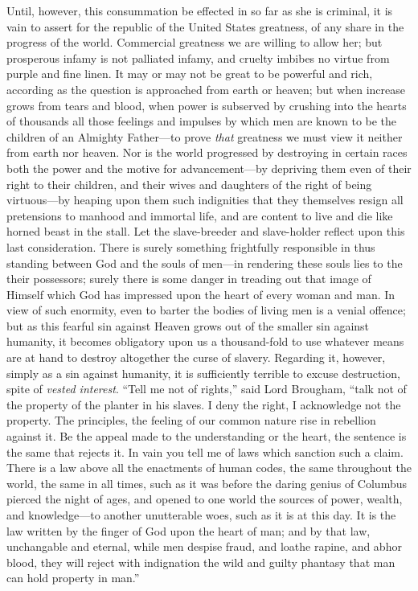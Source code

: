 Until, however, this consummation be effected in so far as she is criminal, it
is vain to assert for the republic of the United States greatness, of any share
in the progress of the world. Commercial greatness we are willing to allow her;
but prosperous infamy is not palliated infamy, and cruelty imbibes no virtue
from purple and fine linen. It may or may not be great to be powerful and rich,
according as the question is approached from earth or heaven; but when increase
grows from tears and blood, when power is subserved by crushing into the hearts
of thousands all those feelings and impulses by which men are known to be the
children of an Almighty Father---to prove \emph{that} greatness we must view it
neither from earth nor heaven. Nor is the world progressed by destroying in
certain races both the power and the motive for advancement---by depriving them
even of their right to their children, and their wives and daughters of the
right of being virtuous---by heaping upon them such indignities that they
themselves resign all pretensions to manhood and immortal life, and are content
to live and die like horned beast in the stall. Let the slave-breeder and
slave-holder reflect upon this last consideration. There is surely something
frightfully responsible in thus standing between God and the souls of men---in
rendering these souls lies to the their possessors; surely there is some danger
in treading out that image of Himself which God has impressed upon the heart of
every woman and man. In view of such enormity, even to barter the bodies of
living men is a venial offence; but as this fearful sin against Heaven grows out
of the smaller sin against humanity, it becomes obligatory upon us a
thousand-fold to use whatever means are at hand to destroy altogether the curse
of slavery. Regarding it, however, simply as a sin against humanity, it is
sufficiently terrible to excuse destruction, spite of \emph{vested interest}.
``Tell me not of rights,'' said Lord Brougham, ``talk not of the property of the
planter in his slaves. I deny the right, I acknowledge not the property. The
principles, the feeling of our common nature rise in rebellion against it. Be
the appeal made to the understanding or the heart, the sentence is the same that
rejects it. In vain you tell me of laws which sanction such a claim. There is a
law above all the enactments of human codes, the same throughout the world, the
same in all times, such as it was before the daring genius of Columbus pierced
the night of ages, and opened to one world the sources of power, wealth, and
knowledge---to another unutterable woes, such as it is at this day. It is the
law written by the finger of God upon the heart of man; and by that law,
unchangable and eternal, while men despise fraud, and loathe rapine, and abhor
blood, they will reject with indignation the wild and guilty phantasy that man
can hold property in man.''

